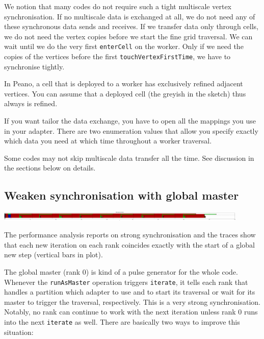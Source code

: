 We notion that many codes do not require such a tight multiscale vertex
synchronisation.
If no multiscale data is exchanged at all, we do not need any of these
synchronous data sends and receives.
If we transfer data only through cells, we do not need the vertex copies before
we start the fine grid traversal.
We can wait until we do the very first \texttt{enterCell} on the worker.
Only if we need the copies of the vertices before the first
\texttt{touchVertexFirstTime}, we have to synchronise tightly.


\begin{remark}
In Peano, a cell that is deployed to a worker has exclusively refined adjacent
vertices. 
You can assume that a deployed cell (the greyish in the sketch) thus always is
refined.
\end{remark}


If you want tailor the data exchange, you have to open all the mappings you use
in your adapter.
There are two enumeration values that allow you specify exactly which data you
need at which time throughout a worker traversal.


\begin{remark}
Some codes may not skip multiscale data transfer all the time. See discussion in
the sections below on details.
\end{remark}


\subsection{Weaken synchronisation with global master}

\begin{center}
  \includegraphics[width=0.9\textwidth]{63_mpi-synchronisation/mpi-phases-after.pdf}
\end{center}


\begin{smell}
The performance analysis reports on strong synchronisation and the traces show
that each new iteration on each rank coincides exactly with the start of a
global new step (vertical bars in plot).
\end{smell}


The global master (rank 0) is kind of a pulse generator for the whole code. 
Whenever the \texttt{runAsMaster} operation triggers \texttt{iterate}, it tells
each rank that handles a partition which adapter to use and to start its
traversal or wait for its master to trigger the traversal, respectively.
This is a very strong synchronisation.
Notably, no rank can continue to work with the next iteration unless rank 0 runs
into the next \texttt{iterate} as well.
There are basically two ways to improve this situation:

